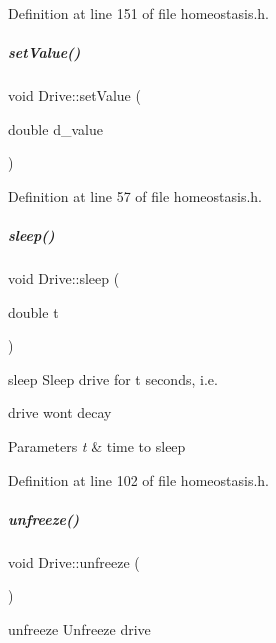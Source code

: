 Definition at line 151 of file homeostasis.\+h.

\mbox{\label{group__homeostasis_a6c5b108ec53e5378f61a0af7ae207dfc}} 
\subparagraph{\texorpdfstring{set\+Value()}{setValue()}}
{\footnotesize\ttfamily void Drive\+::set\+Value (\begin{DoxyParamCaption}\item[{double}]{d\+\_\+value }\end{DoxyParamCaption})\hspace{0.3cm}{\ttfamily [inline]}}



Definition at line 57 of file homeostasis.\+h.

\mbox{\label{group__homeostasis_a029792cdd31295e7b945ca4c0b2c5a73}} 
\subparagraph{\texorpdfstring{sleep()}{sleep()}}
{\footnotesize\ttfamily void Drive\+::sleep (\begin{DoxyParamCaption}\item[{double}]{t }\end{DoxyParamCaption})\hspace{0.3cm}{\ttfamily [inline]}}



sleep Sleep drive for t seconds, i.\+e. 

drive won\textquotesingle{}t decay 
\begin{DoxyParams}{Parameters}
{\em t} & time to sleep \\
\hline
\end{DoxyParams}


Definition at line 102 of file homeostasis.\+h.

\mbox{\label{group__homeostasis_a9ca7343cc59e73fc12daf01a95331794}} 
\subparagraph{\texorpdfstring{unfreeze()}{unfreeze()}}
{\footnotesize\ttfamily void Drive\+::unfreeze (\begin{DoxyParamCaption}{ }\end{DoxyParamCaption})\hspace{0.3cm}{\ttfamily [inline]}}



unfreeze Unfreeze drive 



